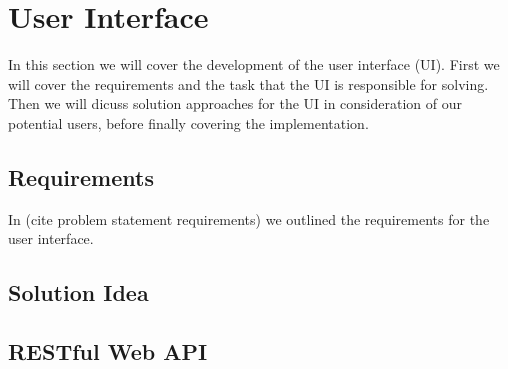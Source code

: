 \section{User Interface}\label{sec:design_ui}

In this section we will cover the development of the user interface (UI). First we will cover the requirements and the task that the UI is responsible for solving. Then we will dicuss solution approaches for the UI in consideration of our potential users, before finally covering the implementation. 

\subsection{Requirements}

In (cite problem statement requirements) we outlined the requirements for the user interface. 

\subsection{Solution Idea}

\subsection{RESTful Web API}